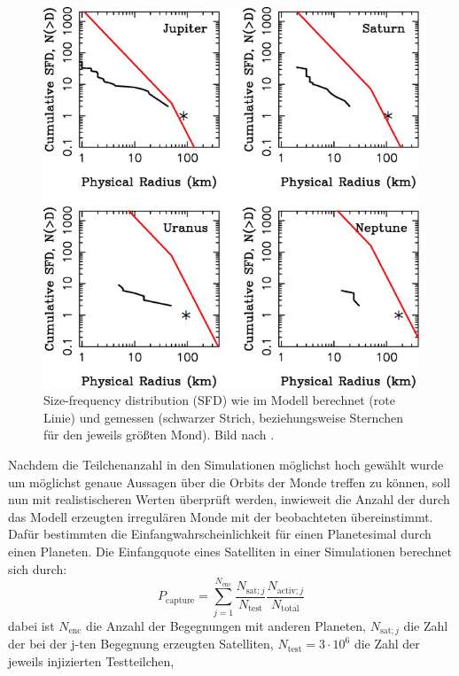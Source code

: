 \documentclass[12pt,a4paper,twoside]{article}
\begin{document}
\begin{figure}[tbn]
\centering
\includegraphics[scale=2]{img/Nesvorny2007-9.jpg}
\caption{Size-frequency distribution (SFD) wie im Modell berechnet (rote Linie) und gemessen (schwarzer Strich, beziehungsweise Sternchen für den jeweils größten Mond). Bild nach \cite{Nesvorny2007}.}
\label{fig:SFD}
\end{figure}
Nachdem die Teilchenanzahl in den Simulationen möglichst hoch gewählt wurde um möglichst genaue Aussagen über die Orbits der Monde treffen zu können, %
soll nun mit realistischeren Werten überprüft werden, inwieweit die Anzahl der durch das Modell erzeugten irregulären Monde mit der beobachteten übereinstimmt.
Dafür bestimmten \cite{Nesvorny2007} die Einfangwahrscheinlichkeit für einen Planetesimal durch einen Planeten.
Die Einfangquote eines Satelliten in einer Simulationen berechnet sich durch:
\begin{equation}
P_{\mathrm{capture}} = \sum\limits^{N_{\mathrm{enc}}}_{j=1} \frac{N_{\mathrm{sat}; j}}{N_{\mathrm{test}}}\frac{N_{\mathrm{activ}; j}}{N_{\mathrm{total}}}
\end{equation} %
dabei ist $N_{\mathrm{enc}}$ die Anzahl der Begegnungen mit anderen Planeten, $N_{\mathrm{sat};j}$ die Zahl der bei der j-ten Begegnung erzeugten Satelliten, $N_{\mathrm{test}} = 3 \cdot 10^6$ die Zahl der jeweils injizierten Testteilchen, %
\end{document}
